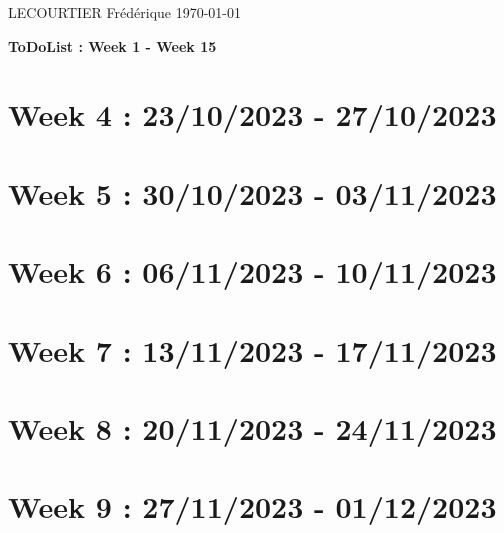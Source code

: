 \documentclass{article}
\begin{document}
	LECOURTIER Frédérique \hfill \today
	\begin{center}
		\Large\textbf{{ToDoList : Week 1 - Week 15}}
	\end{center}
	\tableofcontents

	\newpage

	\section*{Week 4 : 23/10/2023 - 27/10/2023}
	

	\newpage

	\section*{Week 5 : 30/10/2023 - 03/11/2023}
	

	\newpage

	\section*{Week 6 : 06/11/2023 - 10/11/2023}
	

	\newpage

	\section*{Week 7 : 13/11/2023 - 17/11/2023}
	

	\newpage

	\section*{Week 8 : 20/11/2023 - 24/11/2023}
	

	\newpage

	\section*{Week 9 : 27/11/2023 - 01/12/2023}
	

	\newpage
\end{document}

